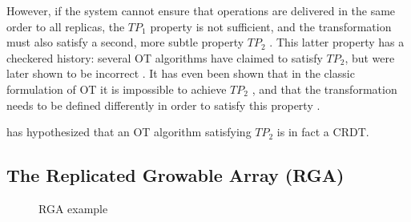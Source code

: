 However, if the system cannot ensure that operations are delivered in the same order to all
replicas, the $\mathit{TP}_1$ property is not sufficient, and the transformation must also satisfy a
second, more subtle property $\mathit{TP}_2$ \cite{Ressel:1996wx}. This latter property has a
checkered history: several OT algorithms have claimed to satisfy $\mathit{TP}_2$, but were later
shown to be incorrect \cite{Imine:2003ks,Imine:2006kn}. It has even been shown that in the classic
formulation of OT it is impossible to achieve $\mathit{TP}_2$ \cite{Randolph:2015gj}, and that the
transformation needs to be defined differently in order to satisfy this property
\cite{Oster:2006tr}.

\citet{Levien:2016wz} has hypothesized that an OT algorithm satisfying $\mathit{TP}_2$ is in fact a
CRDT.


\subsection{The Replicated Growable Array (RGA)}\label{sect.rga.background}

\begin{figure}
\centering

\caption{RGA example}\label{fig.two-lists}
\end{figure}
